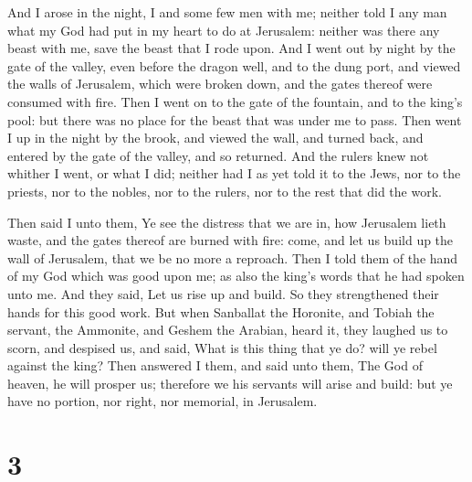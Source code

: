  And I arose in the night, I and some few men with me;
neither told I any man what my God had put in my heart to do at
Jerusalem: neither was there any beast with me, save the beast that I
rode upon.  And I went out by night by the gate of the
valley, even before the dragon well, and to the dung port, and viewed
the walls of Jerusalem, which were broken down, and the gates thereof
were consumed with fire.  Then I went on to the gate of
the fountain, and to the king's pool: but there was no place for the
beast that was under me to pass.  Then went I up in the
night by the brook, and viewed the wall, and turned back, and entered by
the gate of the valley, and so returned.  And the rulers
knew not whither I went, or what I did; neither had I as yet told it to
the Jews, nor to the priests, nor to the nobles, nor to the rulers, nor
to the rest that did the work.

 Then said I unto them, Ye see the distress that we are
in, how Jerusalem lieth waste, and the gates thereof are burned with
fire: come, and let us build up the wall of Jerusalem, that we be no
more a reproach.  Then I told them of the hand of my God
which was good upon me; as also the king's words that he had spoken unto
me. And they said, Let us rise up and build. So they strengthened their
hands for this good work.  But when Sanballat the
Horonite, and Tobiah the servant, the Ammonite, and Geshem the Arabian,
heard it, they laughed us to scorn, and despised us, and said, What is
this thing that ye do? will ye rebel against the king? 
Then answered I them, and said unto them, The God of heaven, he will
prosper us; therefore we his servants will arise and build: but ye have
no portion, nor right, nor memorial, in Jerusalem.

\hypertarget{section-2}{%
\section{3}\label{section-2}}

